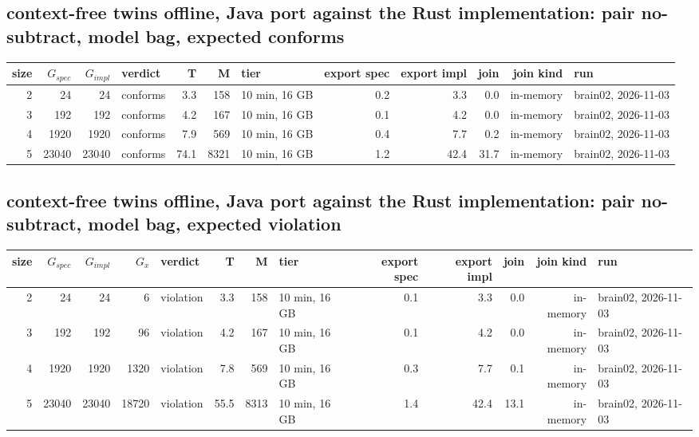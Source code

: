 \documentclass[10pt]{article}
\begin{document}
\subsection*{context-free twins offline, Java port against the Rust implementation: pair \textsf{no-subtract}, model bag, expected conforms}
\begin{longtable}{@{}rrrlrrlrrrrl@{}}
\toprule
size & $G_{\mathit{spec}}$ & $G_{\mathit{impl}}$ & verdict & T & M & tier & export spec & export impl & join & join kind & run \\
\midrule
\endhead
\color{red} 2 & 24 & 24 & conforms & 3.3 & 158 & 10 min, 16 GB & 0.2 & 3.3 & 0.0 & in-memory & brain02, 2026-11-03 \\
\color{red} 3 & 192 & 192 & conforms & 4.2 & 167 & 10 min, 16 GB & 0.1 & 4.2 & 0.0 & in-memory & brain02, 2026-11-03 \\
\color{red} 4 & 1920 & 1920 & conforms & 7.9 & 569 & 10 min, 16 GB & 0.4 & 7.7 & 0.2 & in-memory & brain02, 2026-11-03 \\
\color{red} 5 & 23040 & 23040 & conforms & 74.1 & 8321 & 10 min, 16 GB & 1.2 & 42.4 & 31.7 & in-memory & brain02, 2026-11-03 \\
\bottomrule
\end{longtable}
\subsection*{context-free twins offline, Java port against the Rust implementation: pair \textsf{no-subtract}, model bag, expected violation}
\begin{longtable}{@{}rrrrlrrlrrrrl@{}}
\toprule
size & $G_{\mathit{spec}}$ & $G_{\mathit{impl}}$ & $G_x$ & verdict & T & M & tier & export spec & export impl & join & join kind & run \\
\midrule
\endhead
\color{red} 2 & 24 & 24 & 6 & violation & 3.3 & 158 & 10 min, 16 GB & 0.1 & 3.3 & 0.0 & in-memory & brain02, 2026-11-03 \\
\color{red} 3 & 192 & 192 & 96 & violation & 4.2 & 167 & 10 min, 16 GB & 0.1 & 4.2 & 0.0 & in-memory & brain02, 2026-11-03 \\
\color{red} 4 & 1920 & 1920 & 1320 & violation & 7.8 & 569 & 10 min, 16 GB & 0.3 & 7.7 & 0.1 & in-memory & brain02, 2026-11-03 \\
\color{red} 5 & 23040 & 23040 & 18720 & violation & 55.5 & 8313 & 10 min, 16 GB & 1.4 & 42.4 & 13.1 & in-memory & brain02, 2026-11-03 \\
\bottomrule
\end{longtable}
\end{document}
